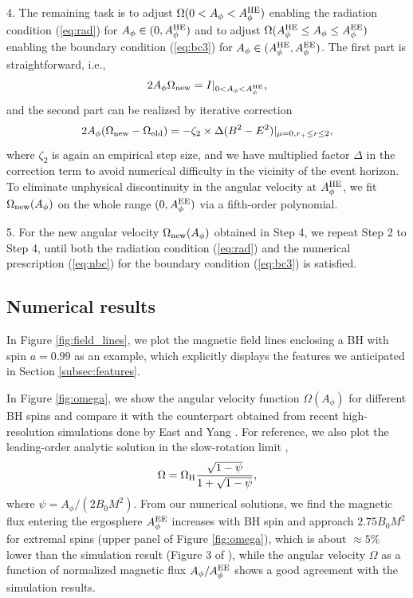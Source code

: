 \documentclass[aps,prd,reprint,nofootinbib, superscriptaddress]{revtex4-1}
\def\Ap{A_\phi}
\def\be{\begin{equation}}
\def\ee{\end{equation}}
\def\WH{\Omega_{\rm H}}
\def\AHE{A_\phi^{\rm HE}}
\def\AEE{A_\phi^{\rm EE}}
\begin{document}
4. The remaining task is to adjust  $\Omega(0< \Ap < \AHE)$ enabling  the radiation condition (\ref{eq:rad})
 for $A_\phi \in (0, A_\phi^{\rm HE})$ and  to adjust $\Omega(\AHE \leq \Ap \leq \AEE)$
 enabling the boundary condition (\ref{eq:bc3}) for $\Ap \in (\AHE, \AEE)$.
 The first part is straightforward, i.e.,
 \be
2\Ap\Omega_{\rm new}  = I|_{0 < \Ap < \AHE},
 \ee
 and the second part can be realized by iterative correction
 \be
2\Ap(\Omega_{\rm new} - \Omega_{\rm old}) =  - \zeta_2\times\Delta (B^2-E^2)|_{\mu=0, r_+\leq r \leq 2},
 \ee
 where $\zeta_2$ is again an empirical step size, and we have multiplied factor $\Delta$
 in the correction term to avoid numerical difficulty in the vicinity of the event horizon.
 To eliminate unphysical discontinuity in the angular
 velocity at $\AHE$, we fit $\Omega_{\rm new}(\Ap)$ on the whole range
 $(0, \AEE)$ via a fifth-order polynomial.

 5. For the new angular velocity $\Omega_{\rm new}(\Ap)$ obtained in Step 4, we repeat Step 2 to Step 4,
 until both the radiation condition (\ref{eq:rad}) and the numerical prescription (\ref{eq:nbc}) for the boundary condition (\ref{eq:bc3}) is satisfied.

\subsection{Numerical results}

In Figure \ref{fig:field_lines}, we plot the magnetic field lines enclosing a BH with spin $a =0.99$ as an example,
which explicitly displays the features we anticipated in Section \ref{subsec:features}.

In Figure \ref{fig:omega}, we show the angular velocity function $\Omega(A_\phi)$ for different BH spins and
compare it with the counterpart obtained from recent high-resolution simulations done by East and Yang \cite{East2018}.
For reference, we also plot the leading-order analytic solution in the slow-rotation
limit \cite{Beskin2013, Pan2014, Gralla2015, East2018},
\be
    \Omega = \WH\frac{\sqrt{1-\psi}} {1+\sqrt{1-\psi}},
\ee
where $\psi = \Ap/(2B_0M^2)$.
From our numerical solutions, we find the magnetic flux entering the ergosphere $\AEE$ increases with BH spin and approach
$2.75 B_0 M^2$ for extremal spins (upper panel of Figure \ref{fig:omega}),
which is about $\approx 5\%$ lower than the simulation result (Figure 3 of \cite{East2018}),
while the angular velocity $\Omega$ as a function
of normalized magnetic flux $\Ap/\AEE$ shows a good agreement with the simulation results.
\end{document}
